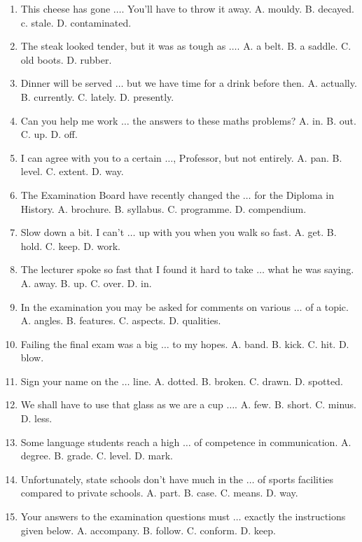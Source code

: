 \documentclass{article}
\numberwithin{equation}{section}
\begin{document}
\begin{enumerate}[leftmargin=8mm]
	\item This cheese has gone $\ldots$. You'll have to throw it away. {\sf A.} mouldy. {\sf B.} decayed. c. stale. {\sf D.} contaminated.
	\item The steak looked tender, but it was as tough as $\ldots$. {\sf A.} a belt. {\sf B.} a saddle. {\sf C.} old boots. {\sf D.} rubber.
	\item Dinner will be served $\ldots$ but we have time for a drink before then. {\sf A.} actually. {\sf B.} currently. {\sf C.} lately. {\sf D.} presently.
	\item Can you help me work $\ldots$ the answers to these maths problems? {\sf A.} in. {\sf B.} out. {\sf C.} up. {\sf D.} off.
	\item I can agree with you to a certain $\ldots$, Professor, but not entirely. {\sf A.} pan. {\sf B.} level. {\sf C.} extent. {\sf D.} way.
	\item The Examination Board have recently changed the $\ldots$ for the Diploma in History. {\sf A.} brochure. {\sf B.} syllabus. {\sf C.} programme. {\sf D.} compendium.
	\item Slow down a bit. I can't $\ldots$ up with you when you walk so fast. {\sf A.} get. {\sf B.} hold. {\sf C.} keep. {\sf D.} work.
	\item The lecturer spoke so fast that I found it hard to take $\ldots$ what he was saying. {\sf A.} away. {\sf B.} up. {\sf C.} over. {\sf D.} in.
	\item In the examination you may be asked for comments on various $\ldots$ of a topic. {\sf A.} angles. {\sf B.} features. {\sf C.} aspects. {\sf D.} qualities.
	\item Failing the final exam was a big $\ldots$ to my hopes. {\sf A.} band. {\sf B.} kick. {\sf C.} hit. {\sf D.} blow.
	\item Sign your name on the $\ldots$ line. {\sf A.} dotted. {\sf B.} broken. {\sf C.} drawn. {\sf D.} spotted.
	\item We shall have to use that glass as we are a cup $\ldots$. {\sf A.} few. {\sf B.} short. {\sf C.} minus. {\sf D.} less.
	\item Some language students reach a high $\ldots$ of competence in communication. {\sf A.} degree. {\sf B.} grade. {\sf C.} level. {\sf D.} mark.
	\item Unfortunately, state schools don't have much in the $\ldots$ of sports facilities compared to private schools. {\sf A.} part. {\sf B.} case. {\sf C.} means. {\sf D.} way.
	\item Your answers to the examination questions must $\ldots$ exactly the instructions given below. {\sf A.} accompany. {\sf B.} follow. {\sf C.} conform. {\sf D.} keep.

\end{enumerate}
\end{document}
